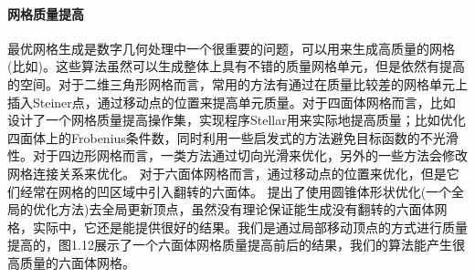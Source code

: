 \paragraph{网格质量提高}
最优网格生成是数字几何处理中一个很重要的问题，可以用来生成高质量的网格(比如\cite{bern1992mesh,owen1998survey,teng2000unstructured,eppstein2001global,shewchuk2011unstructured})。这些算法虽然可以生成整体上具有不错的质量网格单元，但是依然有提高的空间。对于二维三角形网格而言，常用的方法有通过在质量比较差的网格单元上插入Steiner点\cite{ruppert1995delaunay}，通过移动点的位置来提高单元质量\cite{amenta1999optimal}。对于四面体网格而言，比如\cite{Klingner2007}设计了一个网格质量提高操作集，实现程序Stellar用来实际地提高质量；比如\cite{Freitag2002}优化四面体上的Frobenius条件数，同时利用一些启发式的方法避免目标函数的不光滑性。对于四边形网格而言\cite{bommes2013quad}，一类方法通过切向光滑来优化\cite{remacle2012blossom,tarini2010practical}，另外的一些方法会修改网格连接关系来优化\cite{bommes2011global,tarini2011simple}。 对于六面体网格而言，\cite{Frey2008,zhang2009surface}通过移动点的位置来优化，但是它们经常在网格的凹区域中引入翻转的六面体。 \cite{Livesu:2015:Untangler}提出了使用圆锥体形状优化(一个全局的优化方法)去全局更新顶点，虽然没有理论保证能生成没有翻转的六面体网格，实际中，它还是能提供很好的结果。我们是通过局部移动顶点的方式进行质量提高的，图1.12展示了一个六面体网格质量提高前后的结果，我们的算法能产生很高质量的六面体网格。

